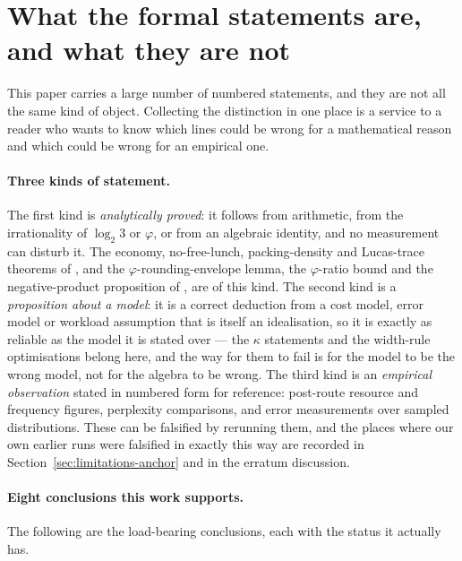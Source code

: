 \section{What the formal statements are, and what they are
not}\label{sec:statusofstatements}

This paper carries a large number of numbered statements, and they are not all the
same kind of object. Collecting the distinction in one place is a service to a
reader who wants to know which lines could be wrong for a mathematical reason and
which could be wrong for an empirical one.

\paragraph{Three kinds of statement.} The first kind is \emph{analytically
proved}: it follows from arithmetic, from the irrationality of $\log_2 3$ or
$\varphi$, or from an algebraic identity, and no measurement can disturb it.
The economy, no-free-lunch, packing-density and Lucas-trace theorems of
\companionname, and the $\varphi$-rounding-envelope lemma, the
$\varphi$-ratio bound and the negative-product proposition of \recordname,
are of this kind. The second kind is a
\emph{proposition about a model}: it is a correct deduction from a cost model,
error model or workload assumption that is itself an idealisation, so it is exactly
as reliable as the model it is stated over --- the $\kappa$ statements and the
width-rule optimisations belong here, and the way for them to fail is for the
model to be the wrong model, not for the algebra to be wrong. The third kind is an
\emph{empirical observation} stated in numbered form for reference: post-route
resource and frequency figures, perplexity comparisons, and error measurements
over sampled distributions. These can be falsified by rerunning them, and the
places where our own earlier runs were falsified in exactly this way are recorded
in Section~\ref{sec:limitations-anchor} and in the erratum discussion.

\paragraph{Eight conclusions this work supports.} The following are the load-bearing
conclusions, each with the status it actually has.

